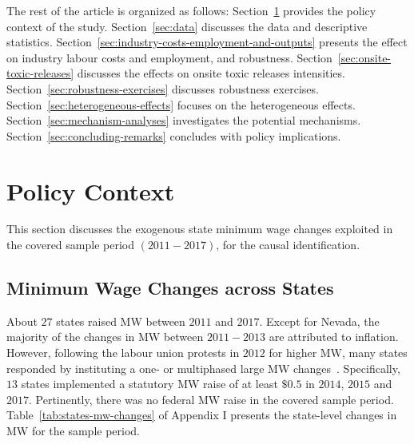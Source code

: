 \documentclass{C:/Users/david/OneDrive/Documents/ULMS/PhD/Thesis/chapter3/src/climate_change/latex/Economic_Journal/OUP-EJ}
\begin{document}
    The rest of the article is organized as follows: Section~\ref{sec:policy-context} provides the policy context of the study. Section~\ref{sec:data} discusses the data and descriptive statistics. Section~\ref{sec:industry-costs-employment-and-outputs} presents the effect on industry labour costs and employment, and robustness. Section~\ref{sec:onsite-toxic-releases} discusses the effects on onsite toxic releases intensities. Section~\ref{sec:robustness-exercises} discusses robustness exercises. Section~\ref{sec:heterogeneous-effects} focuses on the heterogeneous effects. Section~\ref{sec:mechanism-analyses} investigates the potential mechanisms. Section~\ref{sec:concluding-remarks} concludes with policy implications.


    \section{Policy Context}\label{sec:policy-context}
    This section discusses the exogenous state minimum wage changes exploited in the covered sample period $(2011-2017)$, for the causal identification.

    \subsection{Minimum Wage Changes across States}\label{subsec:minimum-wage-changes-across-states}
    About $27$ states raised MW between $2011$ and $2017$. Except for Nevada, the majority of the changes in MW between $2011-2013$ are attributed to inflation. However, following the labour union protests in $2012$ for higher MW, many states responded by instituting a one- or multiphased large MW changes~\citep{lathrop2021raises}. Specifically, $13$ states implemented a statutory MW raise of at least $\$0.5$ in $2014$, $2015$ and $2017$. Pertinently, there was no federal MW raise in the covered sample period. Table~\ref{tab:states-mw-changes} of Appendix I presents the state-level changes in MW for the sample period.
\end{document}
